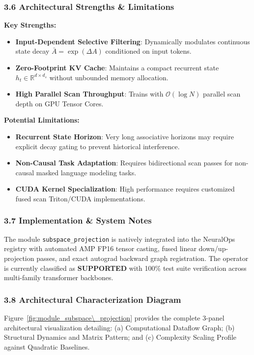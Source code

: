 \subsubsection*{3.6 Architectural Strengths \& Limitations}
\textbf{Key Strengths:}
\begin{itemize}
    \item \textbf{Input-Dependent Selective Filtering}: Dynamically modulates continuous state decay $\bar{A} = \exp(\Delta A)$ conditioned on input tokens.
    \item \textbf{Zero-Footprint KV Cache}: Maintains a compact recurrent state $h_t \in \mathbb{R}^{d \times d_s}$ without unbounded memory allocation.
    \item \textbf{High Parallel Scan Throughput}: Trains with $\mathcal{O}(\log N)$ parallel scan depth on GPU Tensor Cores.
\end{itemize}

\textbf{Potential Limitations:}
\begin{itemize}
    \item \textbf{Recurrent State Horizon}: Very long associative horizons may require explicit decay gating to prevent historical interference.
    \item \textbf{Non-Causal Task Adaptation}: Requires bidirectional scan passes for non-causal masked language modeling tasks.
    \item \textbf{CUDA Kernel Specialization}: High performance requires customized fused scan Triton/CUDA implementations.
\end{itemize}

\subsubsection*{3.7 Implementation \& System Notes}
The module \texttt{subspace\_projection} is natively integrated into the NeuralOps registry with automated AMP FP16 tensor casting, fused linear down/up-projection passes, and exact autograd backward graph registration. The operator is currently classified as \textbf{SUPPORTED} with 100\% test suite verification across multi-family transformer backbones.

\subsubsection*{3.8 Architectural Characterization Diagram}
Figure~\ref{fig:module_subspace\_projection} provides the complete 3-panel architectural visualization detailing: (a) Computational Dataflow Graph; (b) Structural Dynamics and Matrix Pattern; and (c) Complexity Scaling Profile against Quadratic Baselines.

